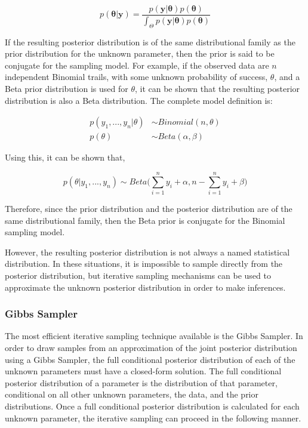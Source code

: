 \documentclass[12pt]{article}\usepackage[]{graphicx}\usepackage[]{color}
\begin{document}
$$p(\bm{\theta}|\bm{y}) = \frac{p(\bm{y}|\bm{\theta})p(\bm{\theta})}{\int_\Theta p(\bm{y}|\bm{\theta})p(\bm{\theta})}$$

\noindent If the resulting posterior distribution is of the same distributional family as the prior distribution for the unknown parameter, then the prior is said to be conjugate for the sampling model. For example, if the observed data are $n$ independent Binomial trails, with some unknown probability of success, $\theta$, and a Beta prior distribution is used for $\theta$, it can be shown that the resulting posterior distribution is also a Beta distribution. The complete model definition is: 

$$
\begin{aligned}
p(y_1, ..., y_n|\theta) &\sim Binomial(n, \theta)\\
p(\theta) &\sim Beta(\alpha, \beta)
\end{aligned}
$$

\noindent Using this, it can be shown that, 

$$p(\theta|y_1, ..., y_n) \sim Beta \bigg( \sum_{i = 1}^n y_i + \alpha, n - \sum_{i = 1}^n y_i + \beta \bigg)$$

\noindent Therefore, since the prior distribution and the posterior distribution are of the same distributional family, then the Beta prior is conjugate for the Binomial sampling model.

However, the resulting posterior distribution is not always a named statistical distribution. In these situations, it is impossible to sample directly from the posterior distribution, but iterative sampling mechanisms can be used to approximate the unknown posterior distribution in order to make inferences. 

\subsubsection{Gibbs Sampler}

The most efficient iterative sampling technique available is the Gibbs Sampler. In order to draw samples from an approximation of the joint posterior distribution using a Gibbs Sampler, the full conditional posterior distribution of each of the unknown parameters must have a closed-form solution. The full conditional posterior distribution of a parameter is the distribution of that parameter, conditional on all other unknown parameters, the data, and the prior distributions. Once a full conditional posterior distribution is calculated for each unknown parameter, the iterative sampling can proceed in the following manner. 
\end{document}
